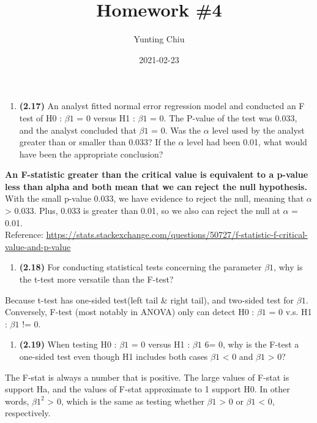 \documentclass[
]{article}
\title{Homework \#4}
\author{Yunting Chiu}
\date{2021-02-23}
\providecommand{\tightlist}{%
  \setlength{\itemsep}{0pt}\setlength{\parskip}{0pt}}
\begin{document}
\maketitle

\begin{enumerate}
\def\labelenumi{\arabic{enumi}.}
\tightlist
\item
  \textbf{(2.17)} An analyst fitted normal error regression model and
  conducted an F test of H0 : \(\beta1\) = 0 versus H1 : \(\beta1\) = 0.
  The P-value of the test was 0.033, and the analyst concluded that
  \(\beta1\) = 0. Was the \(\alpha\) level used by the analyst greater
  than or smaller than 0.033? If the \(\alpha\) level had been 0.01,
  what would have been the appropriate conclusion?
\end{enumerate}

\textbf{An F-statistic greater than the critical value is equivalent to
a p-value less than alpha and both mean that we can reject the null
hypothesis.} With the small p-value 0.033, we have evidence to reject
the null, meaning that \(\alpha\) \textgreater{} 0.033. Plus, 0.033 is
greater than 0.01, so we also can reject the null at \(\alpha\) =
0.01.\\
Reference:
\url{https://stats.stackexchange.com/questions/50727/f-statistic-f-critical-value-and-p-value}

\begin{enumerate}
\def\labelenumi{\arabic{enumi}.}
\setcounter{enumi}{1}
\tightlist
\item
  \textbf{(2.18)} For conducting statistical tests concerning the
  parameter \(\beta1\), why is the t-test more versatile than the
  F-test?
\end{enumerate}

Because t-test has one-sided test(left tail \& right tail), and
two-sided test for \(\beta1\). Conversely, F-test (most notably in
ANOVA) only can detect H0 : \(\beta1\) = 0 v.s. H1 : \(\beta1\) != 0.

\begin{enumerate}
\def\labelenumi{\arabic{enumi}.}
\setcounter{enumi}{2}
\tightlist
\item
  \textbf{(2.19)} When testing H0 : \(\beta1\) = 0 versus H1 :
  \(\beta1\) 6= 0, why is the F-test a one-sided test even though H1
  includes both cases \(\beta1\) \textless{} 0 and \(\beta1\)
  \textgreater{} 0?
\end{enumerate}

The F-stat is always a number that is positive. The large values of
F-stat is support Ha, and the values of F-stat approximate to 1 support
H0. In other words, \(\beta1^2\) \textgreater{} 0, which is the same as
testing whether \(\beta1\) \textgreater{} 0 or \(\beta1\) \textless{} 0,
respectively.
\end{document}
